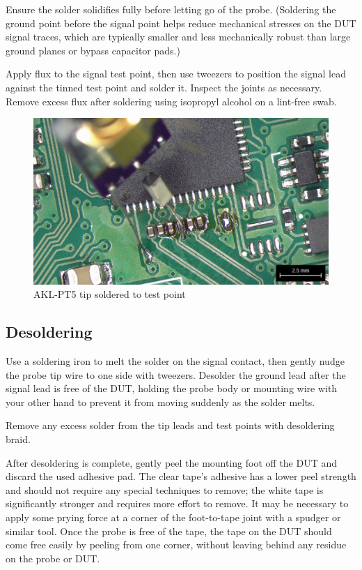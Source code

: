 \documentclass[11pt]{article}
\begin{document}
Ensure the solder solidifies fully before letting go of the probe. (Soldering the ground point before the signal point
helps reduce mechanical stresses on the DUT signal traces, which are typically smaller and less mechanically robust
than large ground planes or bypass capacitor pads.)

Apply flux to the signal test point, then use tweezers to position the signal lead against the tinned test point and
solder it. Inspect the joints as necessary. Remove excess flux after soldering using isopropyl alcohol on a lint-free
swab.

\begin{figure}[h]
\centering
\includegraphics[width=12cm]{tip-soldered.jpg}
\caption{AKL-PT5 tip soldered to test point}
\label{tip-on-testpoint}
\end{figure}
\FloatBarrier

\subsection{Desoldering}

Use a soldering iron to melt the solder on the signal contact, then gently nudge the probe tip wire to one side with
tweezers. Desolder the ground lead after the signal lead is free of the DUT, holding the probe body or mounting wire
with your other hand to prevent it from moving suddenly as the solder melts.

Remove any excess solder from the tip leads and test points with desoldering braid.

After desoldering is complete, gently peel the mounting foot off the DUT and discard the used adhesive pad. The clear
tape's adhesive has a lower peel strength and should not require any special techniques to remove; the white tape is
significantly stronger and requires more effort to remove. It may be necessary to apply some prying force at a corner
of the foot-to-tape joint with a spudger or similar tool. Once the probe is free of the tape, the tape on the DUT
should come free easily by peeling from one corner, without leaving behind any residue on the probe or DUT.
\end{document}
